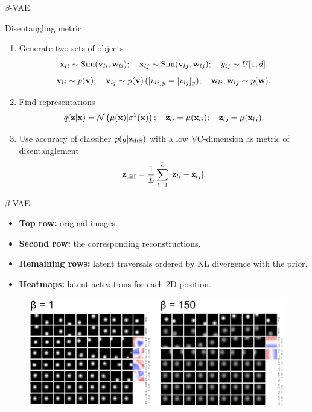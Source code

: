 \begin{frame}{$\beta$-VAE}
	\begin{block}{Disentangling metric}
		\begin{enumerate}
			\item Generate two sets of objects
			\[
			\mathbf{x}_{li} \sim \text{Sim}(\mathbf{v}_{li}, \mathbf{w}_{li}); \quad \mathbf{x}_{lj} \sim \text{Sim}(\mathbf{v}_{lj}, \mathbf{w}_{lj}); \quad y_{ij} \sim U[1, d].
			\]
			\[
			\mathbf{v}_{li} \sim p(\mathbf{v}); \quad \mathbf{v}_{lj} \sim p(\mathbf{v}) \, ([v_{li}]_y = [v_{lj}]_y); \quad \mathbf{w}_{li}, \mathbf{w}_{lj} \sim p(\mathbf{w}).
			\]
			\item Find representations
			\[
			q(\mathbf{z} | \mathbf{x}) = \mathcal{N}\left(\mu(\mathbf{x}) | \sigma^2(\mathbf{x})\right); \quad \mathbf{z}_{li} = \mu(\mathbf{x}_{li}); \quad \mathbf{z}_{lj} = \mu(\mathbf{x}_{lj}).
			\]
			\item Use accuracy of classifier $p(y | \mathbf{z}_{\text{diff}})$ with a low VC-dimension as metric of disentanglement
			\[
			\mathbf{z}_{\text{diff}} = \frac{1}{L} \sum_{l=1}^L | \mathbf{z}_{li} - \mathbf{z}_{lj} |.
			\]
		\end{enumerate}
	\end{block}
	
\end{frame}
\begin{frame}{$\beta$-VAE}
	\begin{itemize}
		\item \textbf{Top row:} original images.
		\item \textbf{Second row:} the corresponding reconstructions. 
		\item \textbf{Remaining rows:} latent traversals ordered by KL divergence with the prior. 
		\item \textbf{Heatmaps:} latent activations for each 2D position.
	\end{itemize}
	\begin{figure}
		\centering
		\includegraphics[width=\linewidth]{figs/betaVAE_6.png}
	\end{figure}
	
\end{frame}
